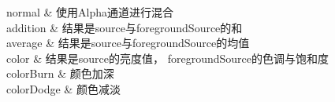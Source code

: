 ﻿




normal
    &
使用Alpha通道进行混合   
    \\

addition
    &
结果是source与foregroundSource的和
    \\


average
    &
结果是source与foregroundSource的均值
    \\

color
    &
结果是source的亮度值，
foregroundSource的色调与饱和度
    \\

colorBurn
    &
颜色加深  %
    \\

colorDodge
    &
颜色减淡  %
    \\










